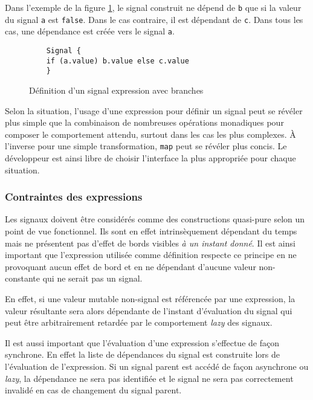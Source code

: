 Dans l'exemple de la figure \ref{fig:signal-expr-branches}, le signal construit ne dépend de \texttt{b} que si la valeur du signal \texttt{a} est \texttt{false}. Dans le cas contraire, il est dépendant de \texttt{c}. Dans tous les cas, une dépendance est créée vers le signal \texttt{a}.

\begin{figure}[!h]
	\begin{lstlisting}
	Signal {
	if (a.value) b.value else c.value
	}
	\end{lstlisting}
	\caption{Définition d'un signal expression avec branches}
	\label{fig:signal-expr-branches}
\end{figure}

Selon la situation, l'usage d'une expression pour définir un signal peut se révéler plus simple que la combinaison de nombreuses opérations monadiques pour composer le comportement attendu, surtout dans les cas les plus complexes. À l'inverse pour une simple transformation, \texttt{map} peut se révéler plus concis. Le développeur est ainsi libre de choisir l'interface la plus appropriée pour chaque situation.

\subsubsection{Contraintes des expressions}

Les signaux doivent être considérés comme des constructions quasi-pure selon un point de vue fonctionnel. Ils sont en effet intrinsèquement dépendant du temps mais ne présentent pas d'effet de bords visibles \emph{à un instant donné}. Il est ainsi important que l'expression utilisée comme définition respecte ce principe en ne provoquant aucun effet de bord et en ne dépendant d'aucune valeur non-constante qui ne serait pas un signal.

En effet, si une valeur mutable non-signal est référencée par une expression, la valeur résultante sera alors dépendante de l'instant d'évaluation du signal qui peut être arbitrairement retardée par le comportement \emph{lazy} des signaux.

Il est aussi important que l'évaluation d'une expression s'effectue de façon synchrone. En effet la liste de dépendances du signal est construite lors de l'évaluation de l'expression. Si un signal parent est accédé de façon asynchrone ou \emph{lazy}, la dépendance ne sera pas identifiée et le signal ne sera pas correctement invalidé en cas de changement du signal parent.


